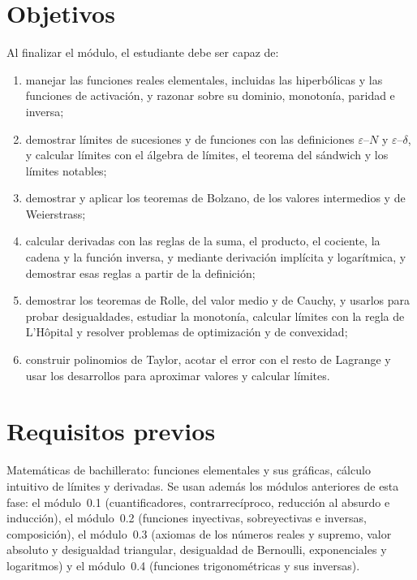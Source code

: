 \documentclass[11pt,a4paper,twoside,openany]{book}
\begin{document}
\section*{Objetivos}
Al finalizar el módulo, el estudiante debe ser capaz de:
\begin{enumerate}[label=\arabic*.]
  \item manejar las funciones reales elementales, incluidas las hiperbólicas y las funciones de activación, y razonar sobre su dominio, monotonía, paridad e inversa;
  \item demostrar límites de sucesiones y de funciones con las definiciones $\varepsilon$--$N$ y $\varepsilon$--$\delta$, y calcular límites con el álgebra de límites, el teorema del sándwich y los límites notables;
  \item demostrar y aplicar los teoremas de Bolzano, de los valores intermedios y de Weierstrass;
  \item calcular derivadas con las reglas de la suma, el producto, el cociente, la cadena y la función inversa, y mediante derivación implícita y logarítmica, y demostrar esas reglas a partir de la definición;
  \item demostrar los teoremas de Rolle, del valor medio y de Cauchy, y usarlos para probar desigualdades, estudiar la monotonía, calcular límites con la regla de L'Hôpital y resolver problemas de optimización y de convexidad;
  \item construir polinomios de Taylor, acotar el error con el resto de Lagrange y usar los desarrollos para aproximar valores y calcular límites.
\end{enumerate}

\section*{Requisitos previos}
Matemáticas de bachillerato: funciones elementales y sus gráficas, cálculo intuitivo de límites y derivadas. Se usan además los módulos anteriores de esta fase: el módulo~0.1 (cuantificadores, contrarrecíproco, reducción al absurdo e inducción), el módulo~0.2 (funciones inyectivas, sobreyectivas e inversas, composición), el módulo~0.3 (axiomas de los números reales y supremo, valor absoluto y desigualdad triangular, desigualdad de Bernoulli, exponenciales y logaritmos) y el módulo~0.4 (funciones trigonométricas y sus inversas).
\end{document}
